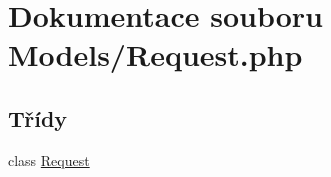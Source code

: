 \hypertarget{_request_8php}{\section{Dokumentace souboru Models/\-Request.php}
\label{_request_8php}
}
\subsection*{Třídy}
\begin{DoxyCompactItemize}
\item 
class \hyperlink{class_request}{Request}
\end{DoxyCompactItemize}
